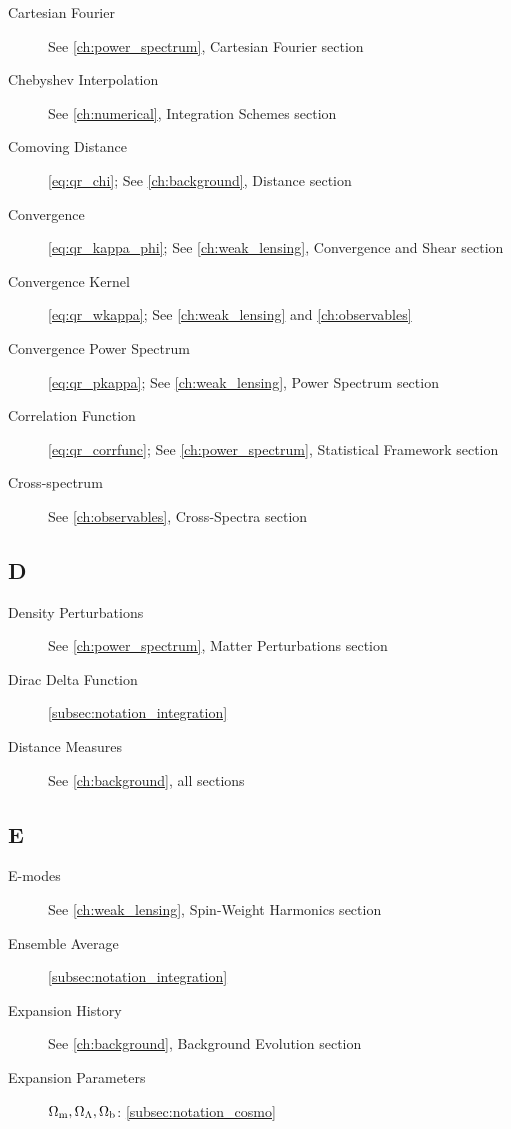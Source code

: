\begin{description}
    \item[Cartesian Fourier] See \cref{ch:power_spectrum}, Cartesian Fourier section
    \item[Chebyshev Interpolation] See \cref{ch:numerical}, Integration Schemes section
    \item[Comoving Distance] \autoref{eq:qr_chi}; See \cref{ch:background}, Distance section
    \item[Convergence] \autoref{eq:qr_kappa_phi}; See \cref{ch:weak_lensing}, Convergence and Shear section
    \item[Convergence Kernel] \autoref{eq:qr_wkappa}; See \cref{ch:weak_lensing} and \cref{ch:observables}
    \item[Convergence Power Spectrum] \autoref{eq:qr_pkappa}; See \cref{ch:weak_lensing}, Power Spectrum section
    \item[Correlation Function] \autoref{eq:qr_corrfunc}; See \cref{ch:power_spectrum}, Statistical Framework section
    \item[Cross-spectrum] See \cref{ch:observables}, Cross-Spectra section
\end{description}

\subsection{D}\label{subsec:idx_d}

\begin{description}
    \item[Density Perturbations] See \cref{ch:power_spectrum}, Matter Perturbations section
    \item[Dirac Delta Function] \autoref{subsec:notation_integration}
    \item[Distance Measures] See \cref{ch:background}, all sections
\end{description}

\subsection{E}\label{subsec:idx_e}

\begin{description}
    \item[E-modes] See \cref{ch:weak_lensing}, Spin-Weight Harmonics section
    \item[Ensemble Average] \autoref{subsec:notation_integration}
    \item[Expansion History] See \cref{ch:background}, Background Evolution section
    \item[Expansion Parameters] $\Omega_{\mathrm{m}}, \Omega_{\Lambda}, \Omega_{\mathrm{b}}$: \autoref{subsec:notation_cosmo}
\end{description}

